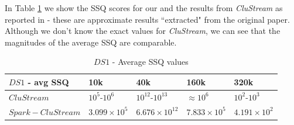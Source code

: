 In Table \ref{tab:DS1quality} we show the SSQ scores for our \our and the results from \emph{CluStream} as reported in \cite{clustreamOrig} - these are approximate results ``extracted" from the original paper.
Although we don't know the exact values for \emph{CluStream}, we can see that the magnitudes of the average SSQ are comparable.

\begin{table}[t]
\centering
  \begin{tabular}{|l|l|l|l|l|}\hline
\textbf{$DS1$ - avg SSQ} & \textbf{10k} & \textbf{40k} & \textbf{160k} & \textbf{320k}\\\hline
$CluStream$ & $10^5$-$10^6$ & $10^{12}$-$10^{13}$ & $\approx 10^6$ & $10^2$-$10^3$\\\hline
$Spark-CluStream$ & $3.099\times10^5$ & $6.676\times10^{12}$ & $7.833\times10^5$ & $4.191\times10^2$\\\hline
  \end{tabular}
  \caption{$DS1$ - Average SSQ values}
  \label{tab:DS1quality}
\end{table}

